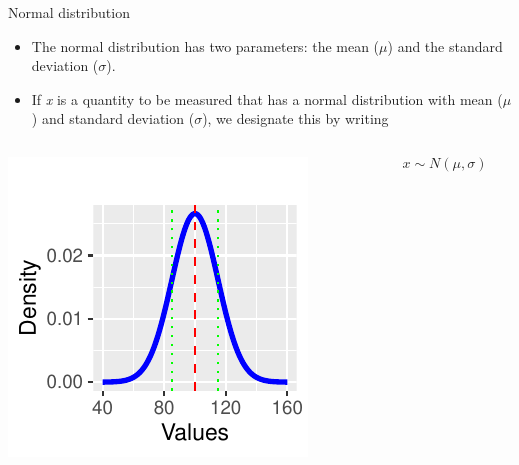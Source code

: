 \documentclass[
  ignorenonframetext,
]{beamer}
\providecommand{\tightlist}{%
  \setlength{\itemsep}{0pt}\setlength{\parskip}{0pt}}
\begin{document}
\begin{frame}{Normal distribution}
\label{normal-distribution}
\begin{itemize}
\tightlist
\item
  The normal distribution has two parameters: the mean (\(\mu\)) and the
  standard deviation (\(\sigma\)).
\end{itemize}

\begin{itemize}
\tightlist
\item
  If \emph{\emph{x}} is a quantity to be measured that has a normal
  distribution with mean (\(\mu\)) and standard deviation (\(\sigma\)),
  we designate this by writing
\end{itemize}

\begin{columns}[T]
\begin{column}{0.48\textwidth}
\includegraphics{M5-Hypothesis-Testing,-Probability-and-Distribution_files/figure-beamer/unnamed-chunk-1-1.pdf}
\end{column}

\begin{column}{0.48\textwidth}
\vspace{2cm}

\[
x \sim N(\mu, \sigma)
\]
\end{column}
\end{columns}
\end{frame}
\end{document}
